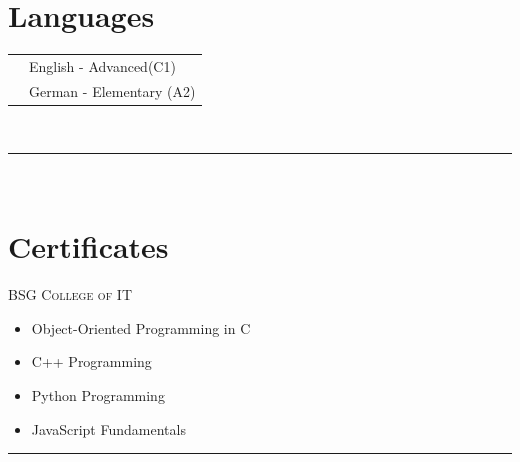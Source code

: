 \documentclass[oneside]{article}
\begin{document}
{\begin{minipage}[t][\textheight-2\fboxsep-2\fboxrule][t]{\dimexpr0.40\textwidth-2\fboxrule-2\fboxsep\relax}
        \section*{\large Languages}
        \begin{tabular}{cl}
            \faLanguage{} & English - Advanced(C1) \\
            \faLanguage{} & German - Elementary (A2) 
        \end{tabular}
        \vspace{0.2cm}
        \\
        \rule{\linewidth}{0.4pt}
        \\%
{}
\section*{\large Certificates}
{\scshape{}\selectfont\footnotesize BSG College of IT}
\begin{itemize}
    \setlength{\itemsep}{-2pt}

    \item Object-Oriented Programming in C
    \item C++ Programming
    \item Python Programming
    \item JavaScript Fundamentals

\end{itemize}

\vspace{-0.1cm}
\rule{\linewidth}{0.4pt}

        
        \vfill
       
    \end{minipage}
}
\hfill
\end{document}
